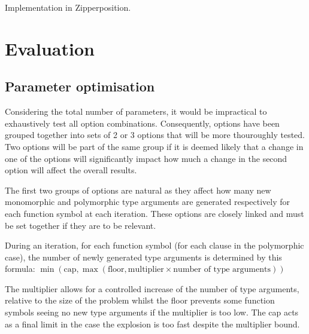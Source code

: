 \documentclass[]{ceurart}
\begin{document}
Implementation in Zipperposition.

\section{Evaluation}
\label{sec:evaluation}


\subsection{Parameter optimisation}

Considering the total number of parameters, it would be impractical to exhaustively test all option combinations. Consequently, options have been grouped together into sets of 2 or 3 options that will be more thouroughly tested. Two options will be part of the same group if it is deemed likely that a change in one of the options will significantly impact how much a change in the second option will affect the overall results.

The first two groups of options are natural as they affect how many new monomorphic and polymorphic type arguments are generated respectively for each function symbol at each iteration. These options are closely linked and must be set together if they are to be relevant.

During an iteration, for each function symbol (for each clause in the polymorphic case), the number of newly generated type arguments is determined by this formula:
\( \min(\text{cap}, \max(\text{floor}, \text{multiplier} \times \text{number of type arguments})) \)

The multiplier allows for a controlled increase of the number of type arguments, relative to the size of the problem whilst the floor prevents some function symbols seeing no new type arguments if the multiplier is too low.
The cap acts as a final limit in the case the explosion is too fast despite the multiplier bound.
\end{document}
